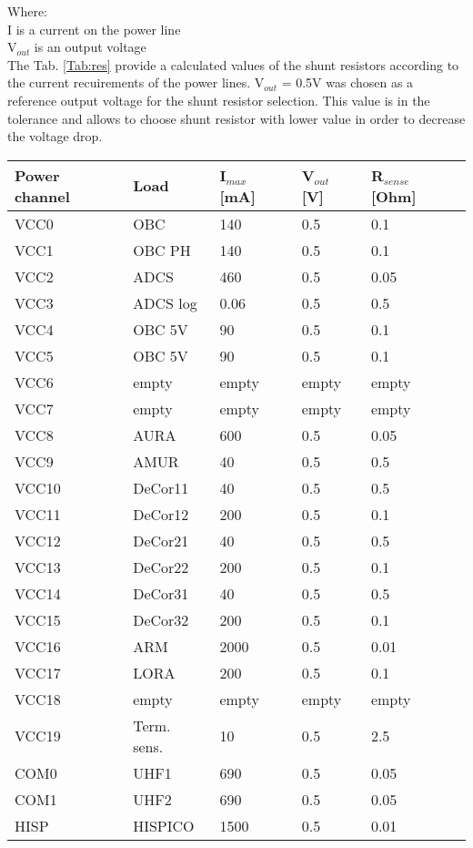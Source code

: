   Where:\\
  I is a current on the power line\\
  V$_{out}$ is an output voltage\\ 
 
 The Tab. \ref{Tab:res} provide a calculated values of the shunt resistors according to the current recuirements of the power lines. V$_{out}$ = 0.5V was chosen as a reference output voltage for the shunt resistor selection. This value is in the tolerance and allows to choose shunt resistor with lower value in order to decrease the voltage drop.
  \newpage
  
   \begin{tabular}{p{3cm}p{3cm}p{2cm}p{2cm}p{3cm}} \toprule
   	Power channel & Load & I$_{max}$ [mA] & V$_{out}$ [V] & R$_{sense}$ [Ohm]\\ \midrule
   VCC0 & OBC & 140 & 0.5 & 0.1\\
   VCC1 & OBC PH & 140 & 0.5 & 0.1\\
   VCC2 & ADCS & 460 & 0.5 & 0.05\\
   VCC3 & ADCS log & 0.06 & 0.5 & 0.5\\
   VCC4 & OBC 5V & 90 & 0.5 & 0.1\\
   VCC5 & OBC 5V & 90 & 0.5 & 0.1\\
   VCC6 & empty & empty & empty & empty\\
   VCC7 & empty & empty & empty & empty\\
   VCC8 & AURA & 600 & 0.5 & 0.05\\
   VCC9 & AMUR & 40 & 0.5 & 0.5\\
   VCC10 & DeCor11 & 40 & 0.5 & 0.5\\
   VCC11 & DeCor12 & 200 & 0.5 & 0.1\\ 
   VCC12 & DeCor21 & 40 & 0.5 & 0.5\\ 
   VCC13 & DeCor22 & 200 & 0.5 & 0.1\\ 
   VCC14 & DeCor31 & 40 & 0.5 & 0.5\\ 
   VCC15 & DeCor32 & 200 & 0.5 & 0.1\\ 
   VCC16 & ARM & 2000 & 0.5 & 0.01\\
   VCC17 & LORA & 200 &  0.5 & 0.1\\
   VCC18 & empty & empty & empty & empty\\
   VCC19 & Term. sens. & 10 & 0.5 & 2.5\\
   COM0 & UHF1 & 690 & 0.5 & 0.05\\
   COM1 & UHF2 & 690 & 0.5 & 0.05\\
   	HISP & HISPICO & 1500 & 0.5& 0.01\\ 
    \bottomrule
   	
   \end{tabular}\\ \\ \\ \\
